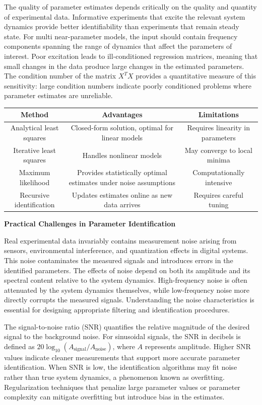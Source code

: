 The quality of parameter estimates depends critically on the quality and quantity of experimental data. Informative experiments that excite the relevant system dynamics provide better identifiability than experiments that remain steady state. For multi near-parameter models, the input should contain frequency components spanning the range of dynamics that affect the parameters of interest. Poor excitation leads to ill-conditioned regression matrices, meaning that small changes in the data produce large changes in the estimated parameters. The condition number of the matrix $X^TX$ provides a quantitative measure of this sensitivity: large condition numbers indicate poorly conditioned problems where parameter estimates are unreliable.

\begin{table}[htbp]
\centering
\begin{tabular}{|c|c|c|}
\hline
\textbf{Method} & \textbf{Advantages} & \textbf{Limitations} \\
\hline
Analytical least squares & Closed-form solution, optimal for linear models & Requires linearity in parameters \\
\hline
Iterative least squares & Handles nonlinear models & May converge to local minima \\
\hline
Maximum likelihood & Provides statistically optimal estimates under noise assumptions & Computationally intensive \\
\hline
Recursive identification & Updates estimates online as new data arrives & Requires careful tuning \\
\hline
\end{tabular}
\label{tab:regression_methods}
\end{table}

\textbf{Practical Challenges in Parameter Identification}

Real experimental data invariably contains measurement noise arising from sensors, environmental interference, and quantization effects in digital systems. This noise contaminates the measured signals and introduces errors in the identified parameters. The effects of noise depend on both its amplitude and its spectral content relative to the system dynamics. High-frequency noise is often attenuated by the system dynamics themselves, while low-frequency noise more directly corrupts the measured signals. Understanding the noise characteristics is essential for designing appropriate filtering and identification procedures.

The signal-to-noise ratio (SNR) quantifies the relative magnitude of the desired signal to the background noise. For sinusoidal signals, the SNR in decibels is defined as $20\log_{10}(A_{\text{signal}}/A_{\text{noise}})$, where $A$ represents amplitude. Higher SNR values indicate cleaner measurements that support more accurate parameter identification. When SNR is low, the identification algorithms may fit noise rather than true system dynamics, a phenomenon known as overfitting. Regularization techniques that penalize large parameter values or parameter complexity can mitigate overfitting but introduce bias in the estimates.

